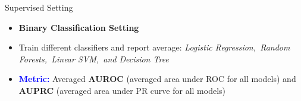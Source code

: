 \documentclass{beamer}
\begin{document}
\begin{frame}{Supervised Setting}

\begin{itemize}
    \item \textbf{Binary Classification Setting}
    \item Train different classifiers and report average: \textit{Logistic Regression,~Random Forests,~Linear SVM,~and Decision Tree}
    \item \textbf{\textcolor{blue}{Metric:}} Averaged \textbf{AUROC} (averaged area under ROC for all models) and \textbf{AUPRC} (averaged area under PR curve for all models)
\end{itemize}

\begin{table}
  \caption{The comparison of different models under $(1,10^{-5})$-DP setting.~For $\epsilon=\infty$, we used our RDP-CGAN model without enforcing privacy.~The acronyms RDP, PATE, and DP, are used for RDP-CGAN, PATE-GAN, and DPGAN, respectively.}
  \label{tab:modelsupervised}
  \centering
\end{table}

\end{frame}

\end{document}
